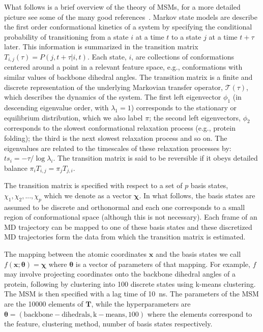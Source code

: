 \documentclass[journal=jacsat,manuscript=article]{achemso}
\begin{document}
What follows is a brief overview of the theory of MSMs, for a more detailed picture see some of the many good references~\cite{prinz_believe_2011, trendelkamp-schroer_estimation_2015}. Markov state models are describe the first order conformational kinetics of a system by specifying the conditional probability of transitioning from a state $i$ at a time $t$ to a state $j$ at a time $t+\tau$  later. This information is summarized in the transition matrix $T_{i, j}(\tau) = P(j, t+\tau | i, t)$. Each state, $i$, are collections of conformations centered around a point in a relevant feature space, e.g., conformations with similar values of backbone dihedral angles. The transition matrix is a finite and discrete representation of the underlying Markovian transfer operator, $\mathcal{T}(\tau)$, which describes the dynamics of the system. The first left eigenvector $\phi_1$ (in descending eigenvalue order, with $\lambda_{1} = 1$) corresponds to the stationary or equilibrium distribution, which we also label $\pi$; the second left eigenvectors, $\phi_2$ corresponds to the slowest conformational relaxation process (e.g., protein folding); the third is the next slowest relaxation process and so on. The eigenvalues are related to the timescales of these relaxation processes by: $ts_{i} = -\tau/\log{\lambda_i}$.  The transition matrix is said to be reversible if it obeys detailed balance $\pi_i T_{i, j}=\pi_j T_{j, i}$. 

The transition matrix is specified with respect to a set of $p$ basis states, $\chi_1, \chi_2, ..., \chi_p$ which we denote as a vector $\bm{\chi}$. In what follows, the basis states are assumed to be discrete and orthonormal and each one corresponds to a small region of conformational space (although this is not necessary).  Each frame of an MD trajectory can be mapped to one of these basis states and these discretized MD trajectories form the data from which the transition matrix is estimated.

The mapping between the atomic coordinates $\mathbf{x}$ and the basis states we call $f(\mathbf{x}; \bm{\theta}) =  \bm{\chi}$ where $\bm{\theta}$ is a vector of parameters of that mapping. For example, $f$ may involve projecting coordinates onto the backbone dihedral angles of a protein, following by clustering into \num{100} discrete states using k-means clustering. The MSM is then specified with a lag time of \SI{10}{\nano\second}. The parameters of the MSM are the \num{10000} elements of $\mathbf{T}$, while the hyperparameters are $\bm{\theta}=(\mathrm{backbone-dihedrals}, \mathrm{k-means}, 100)$ where the elements correspond to the feature, clustering method, number of basis states respectively.  
\end{document}
